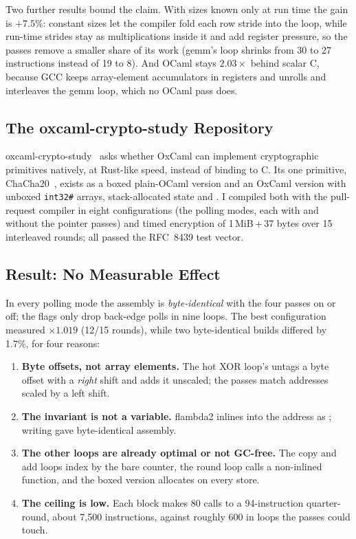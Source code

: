 Two further results bound the claim. With sizes known only at run time the
gain is $+7.5\%$: constant sizes let the compiler fold each row stride into
the loop,
while run-time strides stay as multiplications inside it and add register
pressure, so the passes remove a smaller share of its work (gemm's
loop shrinks from 30 to 27 instructions instead of 19 to 8). And OCaml stays
$2.03\times$ behind scalar C, because GCC keeps array-element accumulators in
registers and unrolls and interleaves the gemm loop, which no OCaml pass does.

\subsection{The oxcaml-crypto-study Repository}
\label{sec:crypto}
oxcaml-crypto-study~\cite{crypto_study} asks whether OxCaml can implement
cryptographic primitives natively, at Rust-like speed, instead of binding to C.
Its one primitive, ChaCha20~\cite{rfc8439}, exists as a boxed plain-OCaml
version and an OxCaml version with unboxed \texttt{int32\#} arrays,
stack-allocated state and . I compiled both with the
pull-request compiler in eight configurations (the polling modes, each with
and without the pointer passes) and timed encryption of 1\,MiB\,+\,37 bytes
over 15 interleaved rounds; all passed the RFC~8439 test vector.

\subsection{Result: No Measurable Effect}
In every polling mode the assembly is \emph{byte-identical} with the four
passes on or off; the flags only drop back-edge polls in nine loops. The best
configuration measured $\times1.019$ (12/15 rounds), while two byte-identical
builds differed by 1.7\%, for four reasons:

\begin{enumerate}
  \item \textbf{Byte offsets, not array elements.} The hot XOR loop's
         untags a byte offset
        with a \emph{right} shift and adds it unscaled; the passes match
        addresses scaled by a left shift.
  \item \textbf{The invariant is not a variable.} flambda2 inlines
         into the address as ; writing
         gave byte-identical assembly.
  \item \textbf{The other loops are already optimal or not GC-free.} The copy
        and add loops index by the bare counter, the round loop calls a
        non-inlined function, and the boxed version allocates on every store.
  \item \textbf{The ceiling is low.} Each block makes 80 calls to a
        94-instruction quarter-round, about 7,500 instructions, against
        roughly 600 in loops the passes could touch.
\end{enumerate}

